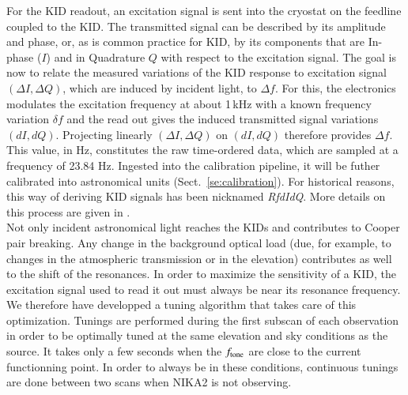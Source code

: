 For the KID readout, an excitation signal is sent into the cryostat on the
feedline coupled to the KID. The transmitted signal can be described by its
amplitude and phase, or, as is common practice for KID, by its components that
are In-phase ($I$) and in Quadrature $Q$ with respect to the excitation
signal. The goal is now to relate the measured variations of the KID response
to excitation signal $(\Delta I, \Delta Q)$, which are induced by incident light, to
$\Delta f$. For this, the electronics modulates the excitation
frequency at about 1\,kHz with a known frequency variation $\delta f$
and the read out gives the induced transmitted signal variations
$(dI, dQ)$. Projecting linearly
$(\Delta I, \Delta Q)$ on $(dI, dQ)$ therefore
provides $\Delta f$. This value, in Hz, constitutes the raw
time-ordered data, which are sampled at a frequency of 23.84
Hz. Ingested into the calibration pipeline, it will be futher calibrated into astronomical units
(Sect.~\ref{se:calibration}). For historical reasons, this way of deriving KID
signals has been nicknamed \emph{RfdIdQ}. More details on this process are given
in \citet{Calvo2013}.\\

Not only incident astronomical light reaches the KIDs and contributes to Cooper
pair breaking. Any change in the background optical load (due, for example, to changes in
the atmospheric transmission or in the elevation) contributes as well to the
shift of the resonances. In order to maximize the sensitivity of a KID, the
excitation signal used to read it out must always be near its resonance
frequency. We therefore have developped a tuning algorithm that takes care of
this optimization. Tunings are performed during the first subscan of each
observation in order to be optimally tuned at the same elevation and sky
conditions as the source. It takes only a few seconds when the $f_{\rm{tone}}$ are
close to the current functionning point. In order to always be in these
conditions, continuous tunings are done between two scans when NIKA2 is not observing.


